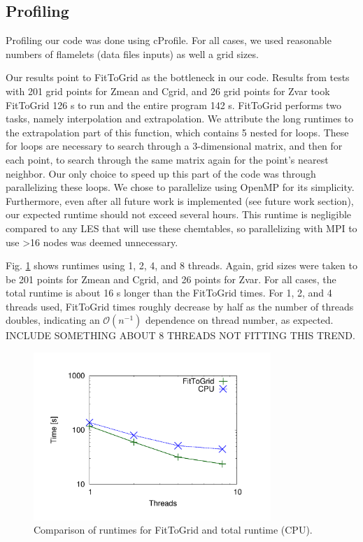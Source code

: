 \documentclass[11pt]{article}
\begin{document}
\subsection{Profiling}
Profiling our code was done using cProfile. For all cases, we used reasonable numbers of flamelets (data files inputs) as well a grid sizes.

Our results point to FitToGrid as the bottleneck in our code. Results from tests with 201 grid points for Zmean and Cgrid, and 26 grid points for Zvar took FitToGrid 126 s to run and the entire program 142 s. FitToGrid performs two tasks, namely interpolation and extrapolation. We attribute the long runtimes to the extrapolation part of this function, which contains 5 nested for loops. These for loops are necessary to search through a 3-dimensional matrix, and then for each point, to search through the same matrix again for the point’s nearest neighbor. Our only choice to speed up this part of the code was through parallelizing these loops. We chose to parallelize using OpenMP for its simplicity. Furthermore, even after all future work is implemented (see future work section), our expected runtime should not exceed several hours. This runtime is negligible compared to any LES that will use these chemtables, so parallelizing with MPI to use >16 nodes was deemed unnecessary.

Fig. \ref{fig:fittogrid} shows runtimes using 1, 2, 4, and 8 threads. Again, grid sizes were taken to be 201 points for Zmean and Cgrid, and 26 points for Zvar. For all cases, the total runtime is about 16 s longer than the FitToGrid times. For 1, 2, and 4 threads used, FitToGrid times roughly decrease by half as the number of threads doubles, indicating an $\mathcal{O}(n^{-1})$ dependence on thread number, as expected. INCLUDE SOMETHING ABOUT 8 THREADS NOT FITTING THIS TREND. 

\begin{figure} [h]
\centering
\includegraphics[width=0.8\textwidth]{plot_threads}
\caption{\label{fig:fittogrid} Comparison of runtimes for FitToGrid and total runtime (CPU).}
\end{figure}
\end{document}
